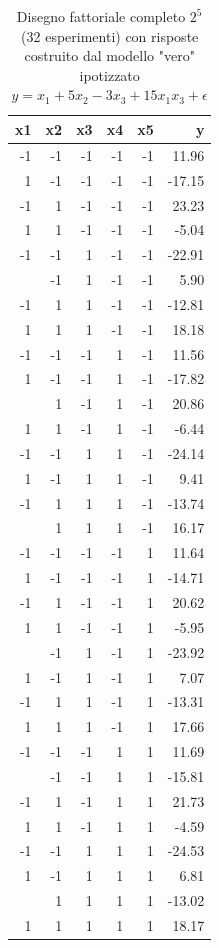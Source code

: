 \documentclass[
  11pt,
]{book}
\begin{document}
\begin{table}

\caption{\label{tab:Conffull}Disegno fattoriale completo $2^5$ (32 esperimenti) con risposte costruito dal modello "vero" ipotizzato $y=x_1+5x_2-3x_3+15x_1x_3+\epsilon$}
\centering
\begin{tabular}[t]{rrrrrr}
\toprule
x1 & x2 & x3 & x4 & x5 & y\\
\midrule
-1 & -1 & -1 & -1 & -1 & 11.96\\
1 & -1 & -1 & -1 & -1 & -17.15\\
-1 & 1 & -1 & -1 & -1 & 23.23\\
1 & 1 & -1 & -1 & -1 & -5.04\\
-1 & -1 & 1 & -1 & -1 & -22.91\\
\addlinespace
1 & -1 & 1 & -1 & -1 & 5.90\\
-1 & 1 & 1 & -1 & -1 & -12.81\\
1 & 1 & 1 & -1 & -1 & 18.18\\
-1 & -1 & -1 & 1 & -1 & 11.56\\
1 & -1 & -1 & 1 & -1 & -17.82\\
\addlinespace
-1 & 1 & -1 & 1 & -1 & 20.86\\
1 & 1 & -1 & 1 & -1 & -6.44\\
-1 & -1 & 1 & 1 & -1 & -24.14\\
1 & -1 & 1 & 1 & -1 & 9.41\\
-1 & 1 & 1 & 1 & -1 & -13.74\\
\addlinespace
1 & 1 & 1 & 1 & -1 & 16.17\\
-1 & -1 & -1 & -1 & 1 & 11.64\\
1 & -1 & -1 & -1 & 1 & -14.71\\
-1 & 1 & -1 & -1 & 1 & 20.62\\
1 & 1 & -1 & -1 & 1 & -5.95\\
\addlinespace
-1 & -1 & 1 & -1 & 1 & -23.92\\
1 & -1 & 1 & -1 & 1 & 7.07\\
-1 & 1 & 1 & -1 & 1 & -13.31\\
1 & 1 & 1 & -1 & 1 & 17.66\\
-1 & -1 & -1 & 1 & 1 & 11.69\\
\addlinespace
1 & -1 & -1 & 1 & 1 & -15.81\\
-1 & 1 & -1 & 1 & 1 & 21.73\\
1 & 1 & -1 & 1 & 1 & -4.59\\
-1 & -1 & 1 & 1 & 1 & -24.53\\
1 & -1 & 1 & 1 & 1 & 6.81\\
\addlinespace
-1 & 1 & 1 & 1 & 1 & -13.02\\
1 & 1 & 1 & 1 & 1 & 18.17\\
\bottomrule
\end{tabular}
\end{table}
\end{document}
